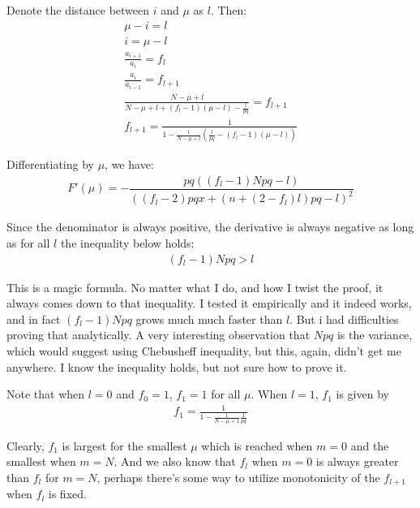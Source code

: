 \documentclass[11pt,draft]{article}
\begin{document}
Denote the distance between $i$ and $\mu$ as $l$.  Then:
\begin{align}
\mu - i = l\\
i = \mu -l \\
\frac{a_{i+1}}{a_{i}} = f_l \\
\frac{a_{i}}{a_{i-1}} = f_{l+1} \\
\frac{   N - \mu + l}{ N - \mu + l  + (f_l - 1)(\mu-l)  - \frac{l}{pq}   } =  f_{l+1}  \\
 f_{l+1} =  \frac{  1 }{ 1  - \frac{1}{N-\mu + l}(\frac{l}{pq} - (f_l - 1)(\mu - l)) } 
\end{align}

Differentiating by $\mu$, we have:
\begin{align}
F'(\mu) = -\dfrac{pq\left(\left(f_l-1\right)Npq-l\right)}{\left(\left(f_l-2\right)pqx+\left(n+\left(2-f_l\right)l\right)pq-l\right)^2}
\end{align}

Since the denominator is always positive, the derivative is always negative as long as for all $l$ the inequality below holds:
\begin{align}
(f_l-1)Npq > l
\end{align}

This is a magic formula.  No matter what I do, and how I twist the proof, it always comes down to that inequality.
I tested it empirically and it indeed works, and in fact $(f_l-1)Npq$ grows much much faster than $l$.
But i had difficulties proving that analytically.
A very interesting observation that $Npq$ is the variance, which would suggest using Chebusheff inequality, but this, again, didn't get me anywhere.
I know the inequality holds, but not sure how to prove it.

Note that when $l=0$  and $f_0=1$, $f_1 = 1$ for all $\mu$.  When $l=1$, $f_1$ is given by
\begin{align}
f_{1} =  \frac{  1 }{ 1  - \frac{1}{N-\mu + 1}\frac{1}{pq} } 
\end{align}

Clearly,  $f_1$ is largest for the smallest $\mu$ which is reached when $m=0$ and the smallest when $m=N$.
And we also know that $f_l$ when $m=0$ is always greater than $f_l$ for $m=N$, perhaps there's some way to utilize monotonicity of the $f_{l+1}$ when $f_l$ is fixed.
\end{document}
